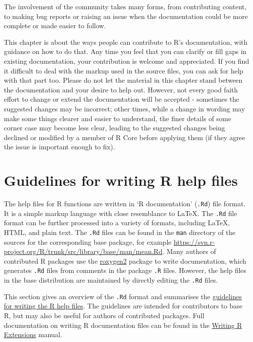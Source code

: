 \documentclass[
]{book}
\begin{document}
The involvement of the community takes many forms, from contributing content, to making bug reports or raising an issue when the documentation could be more complete or made easier to follow.

This chapter is about the ways people can contribute to R's documentation, with guidance on how to do that. Any time you feel that you can clarify or fill gaps in existing documentation, your contribution is welcome and appreciated. If you find it difficult to deal with the markup used in the source files, you can ask for help with that part too. Please do not let the material in this chapter stand between the documentation and your desire to help out. However, not every good faith effort to change or extend the documentation will be accepted - sometimes the suggested changes may be incorrect; other times, while a change in wording may make some things clearer and easier to understand, the finer details of some corner case may become less clear, leading to the suggested changes being declined or modified by a member of R Core before applying them (if they agree the issue is important enough to fix).

\hypertarget{guidelines-for-writing-r-help-files}{%
\section{Guidelines for writing R help files}\label{guidelines-for-writing-r-help-files}}

The help files for R functions are written in `R documentation' (\texttt{.Rd}) file format. It is a simple markup language with close resemblance to LaTeX. The \texttt{.Rd} file format can be further processed into a variety of formats, including LaTeX, HTML, and plain text. The \texttt{.Rd} files can be found in the \texttt{man} directory of the sources for the corresponding base package, for example \url{https://svn.r-project.org/R/trunk/src/library/base/man/mean.Rd}. Many authors of contributed R packages use the \href{https://cran.r-project.org/package=roxygen2}{roxygen2} package to write documentation, which generates \texttt{.Rd} files from comments in the package \texttt{.R} files. However, the help files in the base distribution are maintained by directly editing the \texttt{.Rd} files.

This section gives an overview of the \texttt{.Rd} format and summarises the \href{https://developer.r-project.org/Rds.html}{guidelines for writing the R help files}. The guidelines are intended for contributors to base R, but may also be useful for authors of contributed packages. Full documentation on writing R documentation files can be found in the \href{https://cran.r-project.org/doc/manuals/r-release/R-exts.html\#Writing-R-documentation-files}{Writing R Extensions} manual.
\end{document}
